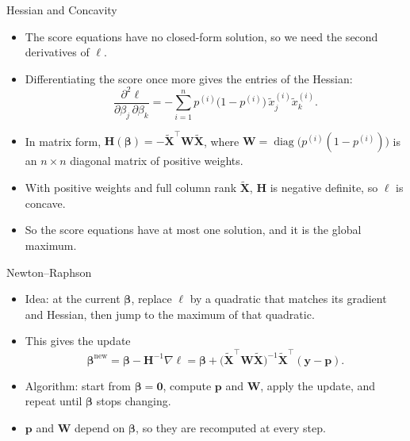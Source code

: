 \begin{frame}{Hessian and Concavity}
    \begin{itemize}
        \item The score equations have no closed-form solution, so we need the second derivatives of $\ell$.
        \item Differentiating the score once more gives the entries of the Hessian:
        \[
            \frac{\partial^2 \ell}{\partial \beta_j \, \partial \beta_k} = -\sum_{i=1}^{n} p^{(i)} \big(1 - p^{(i)}\big) \, \tilde{x}_j^{(i)} \tilde{x}_k^{(i)}.
        \]
        \item In matrix form, $\mathbf{H}(\symbf{\beta}) = -\tilde{\mathbf{X}}^\top \mathbf{W} \tilde{\mathbf{X}}$, where $\mathbf{W} = \operatorname{diag}\big(p^{(i)}(1 - p^{(i)})\big)$ is an $n \times n$ diagonal matrix of positive weights.
        \item With positive weights and full column rank $\tilde{\mathbf{X}}$, $\mathbf{H}$ is negative definite, so $\ell$ is concave.
        \item So the score equations have at most one solution, and it is the global maximum.
    \end{itemize}
\end{frame}


\begin{frame}{Newton--Raphson}
    \begin{itemize}
        \item Idea: at the current $\symbf{\beta}$, replace $\ell$ by a quadratic that matches its gradient and Hessian, then jump to the maximum of that quadratic.
        \item This gives the update
        \[
            \symbf{\beta}^{\text{new}} = \symbf{\beta} - \mathbf{H}^{-1} \nabla \ell = \symbf{\beta} + \big( \tilde{\mathbf{X}}^\top \mathbf{W} \tilde{\mathbf{X}} \big)^{-1} \tilde{\mathbf{X}}^\top (\mathbf{y} - \mathbf{p}).
        \]
        \item Algorithm: start from $\symbf{\beta} = \mathbf{0}$, compute $\mathbf{p}$ and $\mathbf{W}$, apply the update, and repeat until $\symbf{\beta}$ stops changing.
        \item $\mathbf{p}$ and $\mathbf{W}$ depend on $\symbf{\beta}$, so they are recomputed at every step.
    \end{itemize}
\end{frame}


